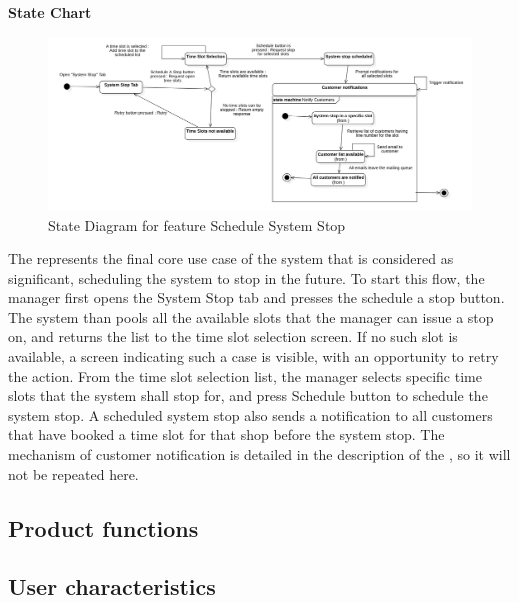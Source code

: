 \textbf{State Chart}

\begin{figure}[H]
    \centering
    \includegraphics[height=0.4\textwidth]{Images/StateCharts/ScheduleSystemStop.png}
    \caption{State Diagram for feature Schedule System Stop}
    \label{fig:SDScheduleStop}
\end{figure}

The  represents the final core use case of the system that is considered as significant, scheduling the system to stop in the future.
To start this flow, the manager first opens the System Stop tab and presses the schedule a stop button.
The system than pools all the available slots that the manager can issue a stop on, and returns the list to the time slot selection screen.
If no such slot is available, a screen indicating such a case is visible, with an opportunity to retry the action.
From the time slot selection list, the manager selects specific time slots that the system shall stop for, and press Schedule button to schedule the system stop.
A scheduled system stop also sends a notification to all customers that have booked a time slot for that shop before the system stop.
The mechanism of customer notification is detailed in the description of the , so it will not be repeated here.


\subsection{Product functions}



\subsection{User characteristics}

